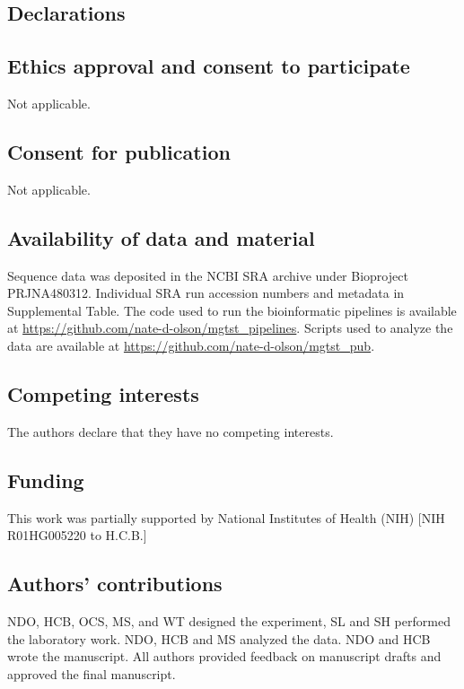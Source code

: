 \documentclass{bmcart}
\begin{document}
\begin{backmatter}

\section*{Declarations}

\subsection*{Ethics approval and consent to participate}
Not applicable.

\subsection*{Consent for publication}
Not applicable.

\subsection*{Availability of data and material}
Sequence data was deposited in the NCBI SRA archive under Bioproject
PRJNA480312.
Individual SRA run accession numbers and metadata in Supplemental Table.
The code used to run the bioinformatic pipelines is available at
\url{https://github.com/nate-d-olson/mgtst_pipelines}.
Scripts used to analyze the data are available at
\url{https://github.com/nate-d-olson/mgtst_pub}.

\subsection*{Competing interests}
The authors declare that they have no competing interests.

\subsection*{Funding}
This work was partially supported by National Institutes of Health (NIH)
{[}NIH R01HG005220 to H.C.B.{]}

\subsection*{Authors' contributions}
NDO, HCB, OCS, MS, and WT designed the experiment, SL and SH performed the laboratory work.
NDO, HCB and MS analyzed the data.
NDO and HCB wrote the manuscript.
All authors provided feedback on manuscript drafts and approved the final manuscript.



\end{backmatter}
\end{document}
